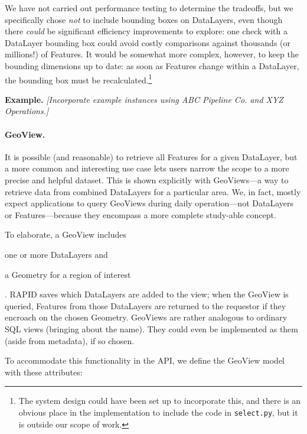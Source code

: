  We have not carried out performance testing to determine the tradeoffs, but we specifically chose \textit{not} to include bounding boxes on DataLayers, even though there \textit{could} be significant efficiency improvements to explore: one check with a DataLayer bounding box could avoid costly comparisons against thousands (or millions!) of Features. It would be somewhat more complex, however, to keep the bounding dimensions up to date: as soon as Features change within a DataLayer, the bounding box must be recalculated.\footnote{The system design could have been set up to incorporate this, and there is an obvious place in the implementation to include the code in \texttt{select.py}, but it is outside our scope of work.}
 
\textbf{Example.} \textit{[Incorporate example instances using ABC Pipeline Co. and XYZ Operations.]}

\paragraph{GeoView.}
It is possible (and reasonable) to retrieve all Features for a given DataLayer, but a more common and interesting use case lets users narrow the scope to a more precise and helpful dataset. This is shown explicitly with GeoViews---a way to retrieve data from combined DataLayers for a particular area. We, in fact, mostly expect applications to query GeoViews during daily operation---not DataLayers or Features---because they encompass a more complete study-able concept.

To elaborate, a GeoView includes 
\begin{enumerate*}[label=\itshape\alph*\upshape)]
\item one or more DataLayers and
\item a Geometry for a region of interest
\end{enumerate*}. RAPID saves which DataLayers are added to the view; when the GeoView is queried, Features from those DataLayers are returned to the requestor if they encroach on the chosen Geometry. GeoViews are rather analogous to ordinary SQL views (bringing about the name). They could even be implemented as them (aside from metadata), if so chosen.

To accommodate this functionality in the API, we define the GeoView model with these attributes:

